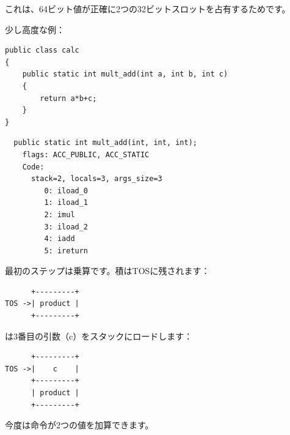 これは、64ビット値が正確に2つの32ビットスロットを占有するためです。

少し高度な例：

\begin{lstlisting}[style=customjava]
public class calc
{
	public static int mult_add(int a, int b, int c)
	{
		return a*b+c;
	}
}
\end{lstlisting}

\begin{lstlisting}
  public static int mult_add(int, int, int);
    flags: ACC_PUBLIC, ACC_STATIC
    Code:
      stack=2, locals=3, args_size=3
         0: iload_0       
         1: iload_1       
         2: imul          
         3: iload_2       
         4: iadd          
         5: ireturn       
\end{lstlisting}

最初のステップは乗算です。積は\ac{TOS}に残されます：

\begin{lstlisting}
      +---------+
TOS ->| product |
      +---------+
\end{lstlisting}

は3番目の引数（c）をスタックにロードします：

\begin{lstlisting}
      +---------+
TOS ->|    c    |
      +---------+
      | product |
      +---------+
\end{lstlisting}

今度は命令が2つの値を加算できます。